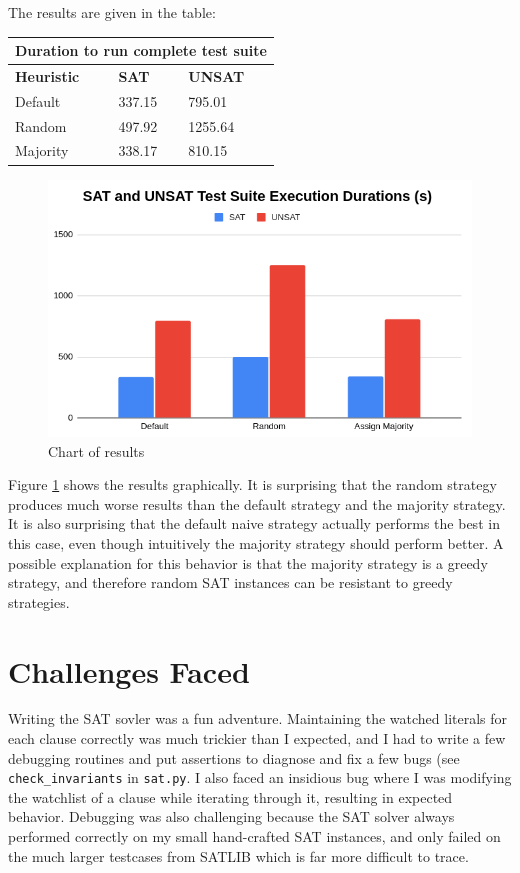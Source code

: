 \documentclass[11pt]{article}
\begin{document}
The results are given in the table:

\begin{tabular}{ |p{3cm}||p{3cm}|p{3cm}|  }
 \hline
 \multicolumn{3}{|c|}{Duration to run complete test suite} \\
 \hline
 \textbf{Heuristic}& \textbf{SAT}& \textbf{UNSAT}\\
 \hline
 Default & 337.15 & 795.01\\
 Random & 497.92  & 1255.64\\
 Majority & 338.17 & 810.15 \\
 \hline
\end{tabular}

\begin{figure}[t]
\centering
\includegraphics[width=12cm]{res}
\caption{Chart of results}
\label{res}
\end{figure}

\medskip

Figure \ref{res} shows the results graphically. It is surprising that the random strategy produces much worse results than the default strategy and the majority strategy. It is also surprising that the default naive strategy actually performs the best in this case, even though intuitively the majority strategy should perform better. A possible explanation for this behavior is that the majority strategy is a greedy strategy, and therefore random SAT instances can be resistant to greedy strategies.

\section{Challenges Faced}

Writing the SAT sovler was a fun adventure. 
Maintaining the watched literals for each clause correctly was much trickier than I expected, and I had to write a few debugging routines and put assertions to diagnose and fix a few bugs (see \texttt{check\_invariants} in \texttt{sat.py}. I also faced an insidious bug where I was modifying the watchlist of a clause while iterating through it, resulting in expected behavior. Debugging was also challenging because the SAT solver always performed correctly on my small hand-crafted SAT instances, and only failed on the much larger testcases from SATLIB which is far more difficult to trace.
\end{document}
